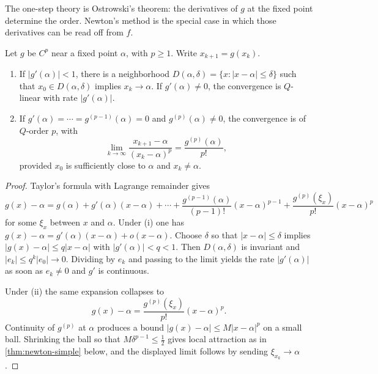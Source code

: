 The one-step theory is Ostrowski's theorem: the derivatives of \(g\) at the fixed point determine the order. Newton's method is the special case in which those derivatives can be read off from \(f\).

\begin{theorem}[Ostrowski]
\label{thm:ostrowski}
Let \(g\) be \(C^p\) near a fixed point \(\alpha\), with \(p\ge 1\). Write \(x_{k+1}=g(x_k)\).
\begin{enumerate}[label=\textup{(\roman*)}]
    \item If \(\lvert g'(\alpha)\rvert<1\), there is a neighborhood \(D(\alpha,\delta)=\{x:\lvert x-\alpha\rvert\le\delta\}\) such that \(x_0\in D(\alpha,\delta)\) implies \(x_k\to\alpha\). If \(g'(\alpha)\neq 0\), the convergence is \(Q\)-linear with rate \(\lvert g'(\alpha)\rvert\).
    \item If \(g'(\alpha)=\cdots=g^{(p-1)}(\alpha)=0\) and \(g^{(p)}(\alpha)\neq 0\), the convergence is of \(Q\)-order \(p\), with
    \[
    \lim_{k\to\infty}
    \frac{x_{k+1}-\alpha}{(x_k-\alpha)^p}
    =
    \frac{g^{(p)}(\alpha)}{p!},
    \]
    provided \(x_0\) is sufficiently close to \(\alpha\) and \(x_k\neq\alpha\).
\end{enumerate}
\end{theorem}

\begin{proof}
Taylor's formula with Lagrange remainder gives
\[
g(x)-\alpha
=
g(\alpha)
+
g'(\alpha)(x-\alpha)
+
\cdots
+
\frac{g^{(p-1)}(\alpha)}{(p-1)!}(x-\alpha)^{p-1}
+
\frac{g^{(p)}(\xi_x)}{p!}(x-\alpha)^p
\]
for some \(\xi_x\) between \(x\) and \(\alpha\). Under (i) one has \(g(x)-\alpha=g'(\alpha)(x-\alpha)+o(x-\alpha)\). Choose \(\delta\) so that \(\lvert x-\alpha\rvert\le\delta\) implies \(\lvert g(x)-\alpha\rvert\le q\lvert x-\alpha\rvert\) with \(\lvert g'(\alpha)\rvert<q<1\). Then \(D(\alpha,\delta)\) is invariant and \(\lvert e_k\rvert\le q^k\lvert e_0\rvert\to 0\). Dividing by \(e_k\) and passing to the limit yields the rate \(\lvert g'(\alpha)\rvert\) as soon as \(e_k\neq 0\) and \(g'\) is continuous.

Under (ii) the same expansion collapses to
\[
g(x)-\alpha
=
\frac{g^{(p)}(\xi_x)}{p!}(x-\alpha)^p.
\]
Continuity of \(g^{(p)}\) at \(\alpha\) produces a bound \(\lvert g(x)-\alpha\rvert\le M\lvert x-\alpha\rvert^p\) on a small ball. Shrinking the ball so that \(M\delta^{p-1}\le\tfrac12\) gives local attraction as in \cref{thm:newton-simple} below, and the displayed limit follows by sending \(\xi_{x_k}\to\alpha\).
\end{proof}

